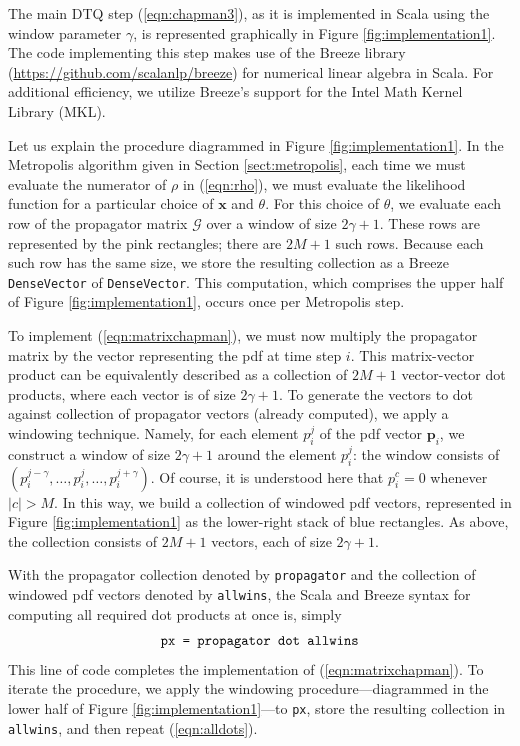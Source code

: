 \documentclass[wcp]{jmlr}
\begin{document}
The main DTQ step (\ref{eqn:chapman3}), as it is implemented in Scala
using the window parameter $\gamma$, is represented graphically in
Figure \ref{fig:implementation1}.  The code implementing this step
makes use of the Breeze library
(\url{https://github.com/scalanlp/breeze}) for numerical linear
algebra in Scala. For additional efficiency, we utilize Breeze's
support for the Intel Math Kernel Library (MKL).

Let us explain the procedure diagrammed in Figure
\ref{fig:implementation1}.  In the Metropolis algorithm given in
Section \ref{sect:metropolis}, each time we must evaluate the
numerator of $\rho$ in (\ref{eqn:rho}), we must evaluate the
likelihood function for a particular choice of $\mathbf{x}$ and
$\theta$.  For this choice of $\theta$, we evaluate  each row of
the propagator matrix $\mathcal{G}$ over a window of size $2 \gamma+1$.  These rows are represented by the pink rectangles; there
are $2M+1$ such rows.  Because each such row has the same size, we
store the resulting collection as a Breeze \texttt{DenseVector} of
\texttt{DenseVector}.  This computation, which comprises the upper
half of Figure \ref{fig:implementation1}, occurs once per Metropolis step.

To implement (\ref{eqn:matrixchapman}), we must now multiply the
propagator matrix by the vector representing the pdf at time step
$i$.  This matrix-vector product can be equivalently described as a
collection of $2M+1$ vector-vector dot products, where each vector is
of size $2\gamma+1$.  To generate the vectors to dot against
collection of propagator vectors (already computed), we apply a
windowing technique.  Namely, for each element $p_i^j$ of the pdf
vector $\mathbf{p}_i$, we construct a window of size $2\gamma+1$
around the element $p_i^j$: the window consists of $(p_i^{j-\gamma},
\ldots, p_i^j, \ldots, p_i^{j+\gamma})$.  Of course, it is understood here
that $p_i^c = 0$ whenever $|c| > M$.  In this way, we build a
collection of windowed pdf vectors, represented in Figure
\ref{fig:implementation1} as the lower-right stack of blue
rectangles.  As above, the collection consists of $2M+1$ vectors, each
of size $2\gamma+1$.

With the propagator collection denoted by \texttt{propagator} and the
collection of windowed pdf vectors denoted by \texttt{allwins}, the
Scala and Breeze syntax for computing all required dot products at once is, simply
\begin{equation}
\label{eqn:alldots}
\text{\texttt{px = propagator dot allwins}}
\end{equation}
This line of code completes the implementation of
(\ref{eqn:matrixchapman}).  To iterate the procedure, we apply the
windowing procedure---diagrammed in the lower half of Figure
\ref{fig:implementation1}---to \texttt{px}, store the resulting
collection in \texttt{allwins}, and then repeat (\ref{eqn:alldots}).
\end{document}
